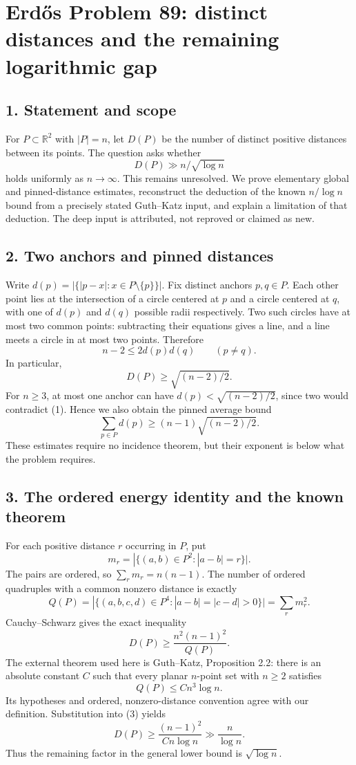 \section*{Erd\H{o}s Problem 89: distinct distances and the remaining logarithmic gap}

\subsection*{1. Statement and scope}
For $P\subset\mathbb R^2$ with $|P|=n$, let $D(P)$ be the number of distinct positive distances between its points. The question asks whether
\[
 D(P)\gg n/\sqrt{\log n}
\]
holds uniformly as $n\to\infty$. This remains unresolved. We prove elementary global and pinned-distance estimates, reconstruct the deduction of the known $n/\log n$ bound from a precisely stated Guth--Katz input, and explain a limitation of that deduction. The deep input is attributed, not reproved or claimed as new.

\subsection*{2. Two anchors and pinned distances}
Write $d(p)=|\{|p-x|:x\in P\setminus\{p\}\}|$. Fix distinct anchors $p,q\in P$. Each other point lies at the intersection of a circle centered at $p$ and a circle centered at $q$, with one of $d(p)$ and $d(q)$ possible radii respectively. Two such circles have at most two common points: subtracting their equations gives a line, and a line meets a circle in at most two points. Therefore
\[
 n-2\le2d(p)d(q)\qquad(p\ne q).\tag{1}
\]
In particular,
\[
 D(P)\ge\sqrt{(n-2)/2}.
\]
For $n\ge3$, at most one anchor can have $d(p)<\sqrt{(n-2)/2}$, since two would contradict (1). Hence we also obtain the pinned average bound
\[
 \sum_{p\in P}d(p)\ge(n-1)\sqrt{(n-2)/2}.\tag{2}
\]
These estimates require no incidence theorem, but their exponent is below what the problem requires.

\subsection*{3. The ordered energy identity and the known theorem}
For each positive distance $r$ occurring in $P$, put
\[
 m_r=|\{(a,b)\in P^2:|a-b|=r\}|.
\]
The pairs are ordered, so $\sum_r m_r=n(n-1)$. The number of ordered quadruples with a common nonzero distance is exactly
\[
 Q(P)=|\{(a,b,c,d)\in P^4:|a-b|=|c-d|>0\}|=\sum_r m_r^2.
\]
Cauchy--Schwarz gives the exact inequality
\[
 D(P)\ge\frac{n^2(n-1)^2}{Q(P)}.\tag{3}
\]
The external theorem used here is Guth--Katz, Proposition 2.2: there is an absolute constant $C$ such that every planar $n$-point set with $n\ge2$ satisfies
\[
 Q(P)\le Cn^3\log n.\tag{4}
\]
Its hypotheses and ordered, nonzero-distance convention agree with our definition. Substitution into (3) yields
\[
 D(P)\ge\frac{(n-1)^2}{Cn\log n}\gg\frac n{\log n}.\tag{5}
\]
Thus the remaining factor in the general lower bound is $\sqrt{\log n}$.


